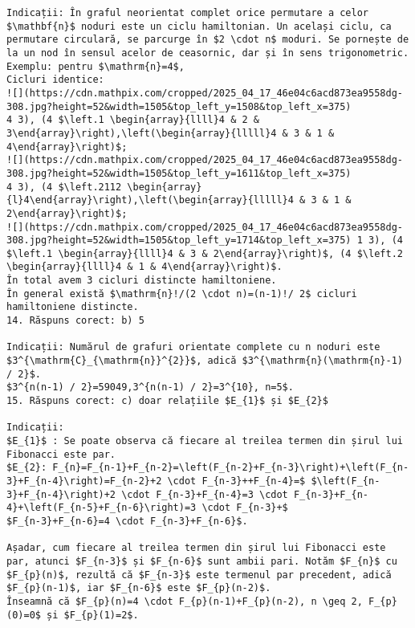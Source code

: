 \begin{verbatim}
Indicații: În graful neorientat complet orice permutare a celor $\mathbf{n}$ noduri este un ciclu hamiltonian. Un același ciclu, ca permutare circulară, se parcurge în $2 \cdot n$ moduri. Se pornește de la un nod în sensul acelor de ceasornic, dar și în sens trigonometric.
Exemplu: pentru $\mathrm{n}=4$,
Cicluri identice:
![](https://cdn.mathpix.com/cropped/2025_04_17_46e04c6acd873ea9558dg-308.jpg?height=52&width=1505&top_left_y=1508&top_left_x=375)
4 3), (4 $\left.1 \begin{array}{llll}4 & 2 & 3\end{array}\right),\left(\begin{array}{lllll}4 & 3 & 1 & 4\end{array}\right)$;
![](https://cdn.mathpix.com/cropped/2025_04_17_46e04c6acd873ea9558dg-308.jpg?height=52&width=1505&top_left_y=1611&top_left_x=375)
4 3), (4 $\left.2112 \begin{array}{l}4\end{array}\right),\left(\begin{array}{lllll}4 & 3 & 1 & 2\end{array}\right)$;
![](https://cdn.mathpix.com/cropped/2025_04_17_46e04c6acd873ea9558dg-308.jpg?height=52&width=1505&top_left_y=1714&top_left_x=375) 1 3), (4 $\left.1 \begin{array}{llll}4 & 3 & 2\end{array}\right)$, (4 $\left.2 \begin{array}{llll}4 & 1 & 4\end{array}\right)$.
În total avem 3 cicluri distincte hamiltoniene.
În general există $\mathrm{n}!/(2 \cdot n)=(n-1)!/ 2$ cicluri hamiltoniene distincte.
14. Răspuns corect: b) 5

Indicații: Numărul de grafuri orientate complete cu n noduri este $3^{\mathrm{C}_{\mathrm{n}}^{2}}$, adică $3^{\mathrm{n}(\mathrm{n}-1) / 2}$.
$3^{n(n-1) / 2}=59049,3^{n(n-1) / 2}=3^{10}, n=5$.
15. Răspuns corect: c) doar relațiile $E_{1}$ și $E_{2}$

Indicații:
$E_{1}$ : Se poate observa că fiecare al treilea termen din șirul lui Fibonacci este par.
$E_{2}: F_{n}=F_{n-1}+F_{n-2}=\left(F_{n-2}+F_{n-3}\right)+\left(F_{n-3}+F_{n-4}\right)=F_{n-2}+2 \cdot F_{n-3}++F_{n-4}=$ $\left(F_{n-3}+F_{n-4}\right)+2 \cdot F_{n-3}+F_{n-4}=3 \cdot F_{n-3}+F_{n-4}+\left(F_{n-5}+F_{n-6}\right)=3 \cdot F_{n-3}+$
$F_{n-3}+F_{n-6}=4 \cdot F_{n-3}+F_{n-6}$.

Așadar, cum fiecare al treilea termen din șirul lui Fibonacci este par, atunci $F_{n-3}$ și $F_{n-6}$ sunt ambii pari. Notăm $F_{n}$ cu $F_{p}(n)$, rezultă că $F_{n-3}$ este termenul par precedent, adică $F_{p}(n-1)$, iar $F_{n-6}$ este $F_{p}(n-2)$.
Înseamnă că $F_{p}(n)=4 \cdot F_{p}(n-1)+F_{p}(n-2), n \geq 2, F_{p}(0)=0$ și $F_{p}(1)=2$.


\end{verbatim}
